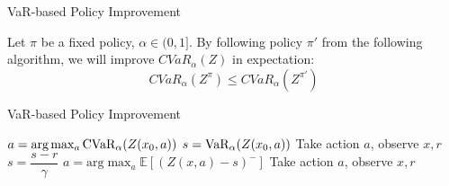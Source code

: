 \documentclass{beamer}
\begin{document}

%
%
%



\begin{frame}{VaR-based Policy Improvement}
\begin{theorem}
Let $\pi$ be a fixed policy, $\alpha \in (0, 1]$. By following policy $\pi'$ from the following algorithm, we will improve $CVaR_\alpha(Z)$ in expectation: $$CVaR_\alpha(Z^\pi) \le CVaR_\alpha(Z^{\pi'})$$
\end{theorem}
\begin{block}{VaR-based Policy Improvement}
\begin{algorithmic}
    \STATE $a = \text{arg}\max_a \text{CVaR}_\alpha(Z(x_0, a))$
    \STATE $s = \text{VaR}_\alpha(Z(x_0, a))$
    \STATE Take action $a$, observe $x, r$
    	\STATE $s = \dfrac{s-r}{\gamma}$
    	\STATE $a = \text{arg}\max_a \mathbb{E}\left[(Z(x, a)-s)^- \right]$
    	\STATE Take action $a$, observe $x, r$
   	\ENDWHILE
\end{algorithmic}
\end{block}
\end{frame}


\end{document}
